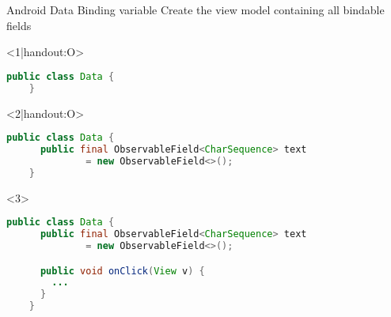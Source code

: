 \begin{frame}[fragile]{Android Data Binding variable}
Create the view model containing all bindable fields

\begin{onlyenv}<1|handout:O>
  \begin{lstlisting}[language=Java]
    public class Data {
    }
  \end{lstlisting}
\end{onlyenv}
\begin{onlyenv}<2|handout:O>
  \begin{lstlisting}[language=Java]
    public class Data {
      public final ObservableField<CharSequence> text
              = new ObservableField<>();
    }
  \end{lstlisting}
\end{onlyenv}
\begin{onlyenv}<3>
  \begin{lstlisting}[language=Java]
    public class Data {
      public final ObservableField<CharSequence> text
              = new ObservableField<>();

      public void onClick(View v) {
        ...
      }
    }
  \end{lstlisting}
\end{onlyenv}
\end{frame}
